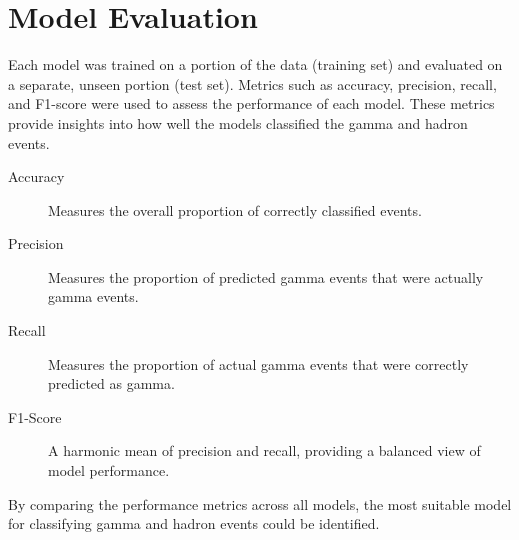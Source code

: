 \section{Model Evaluation}

Each model was trained on a portion of the data (training set) and evaluated on
a separate, unseen portion (test set). Metrics such as accuracy, precision,
recall, and F1-score were used to assess the performance of each model. These
metrics provide insights into how well the models classified the gamma and
hadron events.

\begin{description}
    \item[Accuracy] Measures the overall proportion of correctly classified
    events.
    \item[Precision] Measures the proportion of predicted gamma events that were
    actually gamma events.
    \item[Recall] Measures the proportion of actual gamma events that were
    correctly predicted as gamma.
    \item[F1-Score] A harmonic mean of precision and recall, providing a
    balanced view of model performance.
\end{description}

By comparing the performance metrics across all models, the most suitable model
for classifying gamma and hadron events could be identified.
